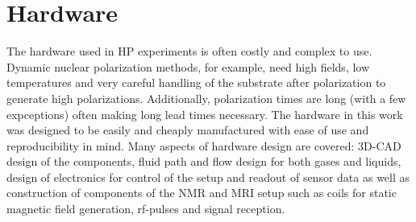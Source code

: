 \section{Hardware}
The hardware used in HP experiments is often costly and complex to use. Dynamic nuclear polarization methods, for example, need high fields, low temperatures and very careful handling of the substrate after polarization to generate high polarizations. Additionally, polarization times are long (with a few expceptions) often making long lead times necessary. The hardware in this work was designed to be easily and cheaply manufactured with ease of use and reproducibility in mind. Many aspects of hardware design are covered: 3D-CAD design of the components, fluid path and flow design for both gases and liquids, design of electronics for control of the setup and readout of sensor data as well as construction of components of the NMR and MRI setup such as coils for static magnetic field generation, rf-pulses and signal reception.
